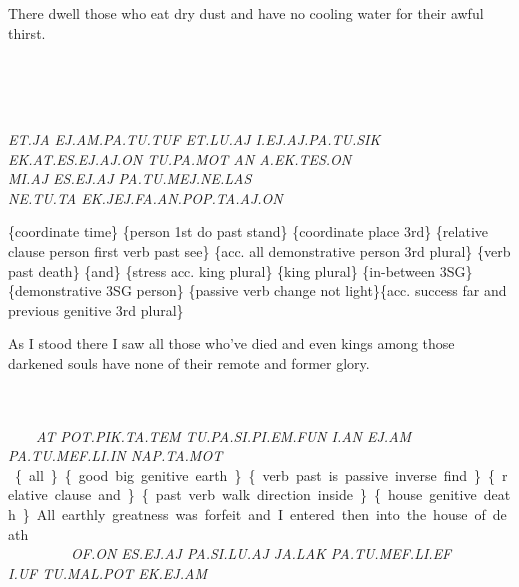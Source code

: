 {There dwell those who eat dry dust and have no cooling water for their awful thirst.  
 
\drie

\et\ja ~ \ej\am\pa\tu\tuf ~ \et\lu\aj ~ \Atlani\ej\aj\pa\tu\sik \\~ \ek\at\es\ej\aj\on ~  \tu\pa\mot ~ \an ~ \Atlana\ek\tes\on ~ \\ ~  \mi\aj ~ \es\ej\aj ~ \pa\tu\mej\Atlanne\las ~  \\ \Atlanne\tu\ta \ek\jej\fa\an\pop\ta\aj\on 

{\it ET.JA EJ.AM.PA.TU.TUF ET.LU.AJ I.EJ.AJ.PA.TU.SIK \\EK.AT.ES.EJ.AJ.ON TU.PA.MOT AN A.EK.TES.ON \\ MI.AJ ES.EJ.AJ PA.TU.MEJ.NE.LAS \\NE.TU.TA EK.JEJ.FA.AN.POP.TA.AJ.ON }


\{coordinate time\} \{person 1st do past stand\} \{coordinate place 3rd\} \{relative clause person first verb past see\} \{acc. all demonstrative person 3rd plural\} \{verb past death\} \{and\} \{stress acc. king plural\} \{king plural\} \{in-between 3SG\} \{demonstrative 3SG person\} \{passive verb change not light\}\{acc. success far and previous genitive 3rd plural\}

As I stood there I saw all those who've died and even kings among those darkened souls have none of their remote and former glory. 
 
\drie 

\at ~ \pot\pik\ta\tem ~ \tu\pa\si\Atlanpi\Atlanem\fun ~ \Atlani\an ~ \ej\am ~ \\\pa\tu\mef\li\Atlanin~ \\\nap\ta\mot

{\it AT POT.PIK.TA.TEM TU.PA.SI.PI.EM.FUN I.AN EJ.AM \\PA.TU.MEF.LI.IN NAP.TA.MOT }


\{all\} \{good big genitive earth\} \{verb past is passive inverse find\} \{relative clause and\} \{past verb walk direction inside\} \{house genitive death\} 

All earthly greatness was forfeit and I entered then into the house of death.  
 
 
\drie


\of\on ~ \es\ej\aj ~ \pa\si\lu\aj ~ \ja\lak ~ \pa\tu\mef\li\ef~\\\Atlani\uf~\tu\mal\pot~\ek\ej\am 

{\it OF.ON ES.EJ.AJ PA.SI.LU.AJ JA.LAK PA.TU.MEF.LI.EF \\I.UF TU.MAL.POT EK.EJ.AM} 


}
